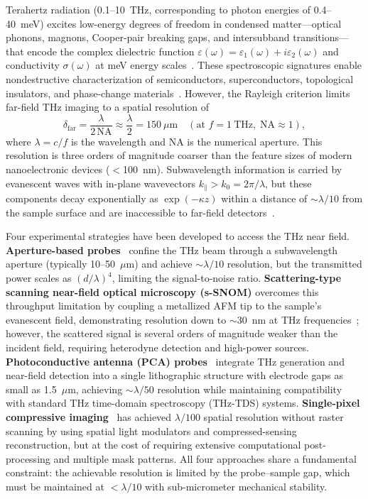 \documentclass[reprint,superscriptaddress,amsmath,amssymb]{revtex4-2}
\begin{document}
Terahertz radiation (0.1--10~THz, corresponding to photon energies of 0.4--40~meV) excites low-energy degrees of freedom in condensed matter---optical phonons, magnons, Cooper-pair breaking gaps, and intersubband transitions---that encode the complex dielectric function $\varepsilon(\omega) = \varepsilon_1(\omega) + i\varepsilon_2(\omega)$ and conductivity $\sigma(\omega)$ at meV energy scales~\cite{Adam2011}. These spectroscopic signatures enable nondestructive characterization of semiconductors, superconductors, topological insulators, and phase-change materials~\cite{Bitzer2010,Chen2019}. However, the Rayleigh criterion limits far-field THz imaging to a spatial resolution of
\begin{equation}
\delta_{\mathrm{far}} = \frac{\lambda}{2\,\mathrm{NA}} \approx \frac{\lambda}{2} = 150~\mu\mathrm{m} \quad (\text{at } f = 1~\mathrm{THz},\; \mathrm{NA} \approx 1),
\end{equation}
where $\lambda = c/f$ is the wavelength and NA is the numerical aperture. This resolution is three orders of magnitude coarser than the feature sizes of modern nanoelectronic devices ($<$100~nm). Subwavelength information is carried by evanescent waves with in-plane wavevectors $k_{\parallel} > k_0 = 2\pi/\lambda$, but these components decay exponentially as $\exp(-\kappa z)$ within a distance of $\sim\!\lambda/10$ from the sample surface and are inaccessible to far-field detectors~\cite{Adam2011}.

Four experimental strategies have been developed to access the THz near field. \textbf{Aperture-based probes}~\cite{Adam2011} confine the THz beam through a subwavelength aperture (typically 10--50~$\mu$m) and achieve $\sim\!\lambda/10$ resolution, but the transmitted power scales as $(d/\lambda)^4$, limiting the signal-to-noise ratio. \textbf{Scattering-type scanning near-field optical microscopy (s-SNOM)} overcomes this throughput limitation by coupling a metallized AFM tip to the sample's evanescent field, demonstrating resolution down to $\sim$30~nm at THz frequencies~\cite{Hale2023}; however, the scattered signal is several orders of magnitude weaker than the incident field, requiring heterodyne detection and high-power sources. \textbf{Photoconductive antenna (PCA) probes}~\cite{Bitzer2010,Nagel2012} integrate THz generation and near-field detection into a single lithographic structure with electrode gaps as small as 1.5~$\mu$m, achieving $\sim\!\lambda/50$ resolution while maintaining compatibility with standard THz time-domain spectroscopy (THz-TDS) systems. \textbf{Single-pixel compressive imaging}~\cite{Chen2019} has achieved $\lambda/100$ spatial resolution without raster scanning by using spatial light modulators and compressed-sensing reconstruction, but at the cost of requiring extensive computational post-processing and multiple mask patterns. All four approaches share a fundamental constraint: the achievable resolution is limited by the probe--sample gap, which must be maintained at $<\!\lambda/10$ with sub-micrometer mechanical stability.
\end{document}
